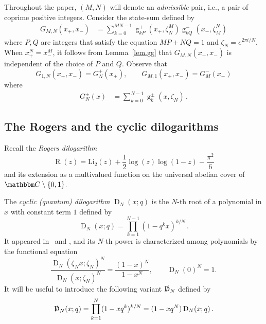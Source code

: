 \documentclass[12pt]{amsart}
\theoremstyle{definition}
\def\BC{\mathbbm C}
\newcommand{\im}{\mathsf{i}}
\begin{document}
Throughout the paper, $(M,N)$ will denote an {\em admissible} pair, i.e.,
a pair of coprime positive integers. Consider the state-sum defined by
\begin{align}
G_{M,N}(x_+,x_-)&=\sum_{k=0}^{MN-1} \operatorname{g}^+_{kP}(x_+,\zeta_N^M)
\operatorname{g}^-_{kQ}(x_-,\zeta_M^N)
\end{align}
where $P,Q$ are integers that satisfy the equation $MP+NQ=1$
and $\zeta_N=e^{2 \pi i/N}$. When $x_+^N=x_-^M$, it follows from
Lemma~\ref{lem.gg} that $G_{M,N}(x_+,x_-)$ is independent of the choice of 
$P$ and $Q$. Observe that
$$
G_{1,N}(x_+,x_-)=G^+_N(x_+), \qquad G_{M,1}(x_+,x_-)=G^-_M(x_-) 
$$
where
\begin{align}
\label{eq.GN}
G^\pm_N(x)&=\sum_{k=0}^{N-1} \operatorname{g}^\pm_k(x,\zeta_N) \,.
\end{align}

\subsection{The Rogers and the cyclic dilogarithms}
\label{sub.dilog}

Recall the {\em Rogers dilogarithm}~\cite{Neumann:CCS,Goette}
\begin{equation}
\label{eq.rogers}
\operatorname{R}(z)=
\operatorname{Li_2}(z)+\frac12 \log(z)\log(1-z)-\frac{\pi^2}{6}
\end{equation}
and its extension as a multivalued function on the universal abelian cover
of $\BC\setminus\{0,1\}$.

The {\em cyclic (quantum) dilogarithm} $\operatorname{D}_N(x;q)$ is the 
$N$-th root of a polynomial in $x$ with constant term $1$ defined by
\begin{equation}
\label{eq.DN}
\operatorname{D}_N(x;q)=\prod_{k=1}^{N-1} (1-q^k x)^{k/N} \,.
\end{equation}
It appeared in~\cite[Eqn.C.3]{Kashaev:star} and 
\cite[Eqn.2.30]{Kashaev:quantum.hyper}, and its $N$-th power
is characterized among polynomials by the functional equation
$$
\frac{\operatorname{D}_N(\zeta_N x;\zeta_N)^N}{\operatorname{D}_N(x;\zeta_N)^N}
= \frac{(1-x)^N}{1-x^N}, \qquad \operatorname{D}_N(0)^N=1.
$$
It will be useful to introduce the following variant 
$\slashed{\operatorname{D}}_N$ defined by
\begin{equation}
\slashed{\operatorname{D}}_N(x;q)
=\prod_{k=1}^{N}(1-xq^k)^{k/N}=(1-xq^N)\operatorname{D}_N(x;q) \,.
\end{equation}
\end{document}
